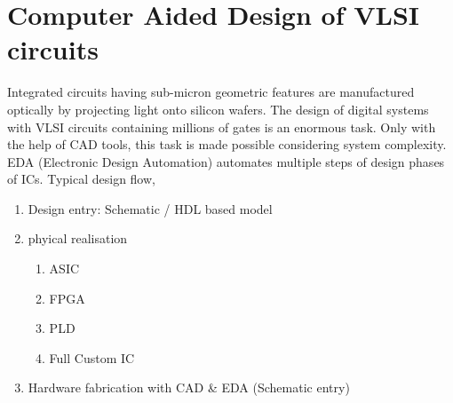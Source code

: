 \section{Computer Aided Design of VLSI circuits}
Integrated circuits having sub-micron geometric features are manufactured optically by projecting light onto silicon wafers. The design of digital systems with VLSI circuits containing millions of gates is an enormous task. Only with the help of CAD tools, this task is made possible considering system complexity.\\ 
EDA (Electronic Design Automation) automates multiple steps of design phases of ICs. Typical design flow, 

\begin{enumerate}
    \item Design entry: Schematic / HDL based model 
    \item phyical realisation 
    \begin{enumerate}
        \item ASIC 
        \item FPGA 
        \item PLD 
        \item Full Custom IC
    \end{enumerate}
    \item Hardware fabrication with CAD \& EDA (Schematic entry)
\end{enumerate}